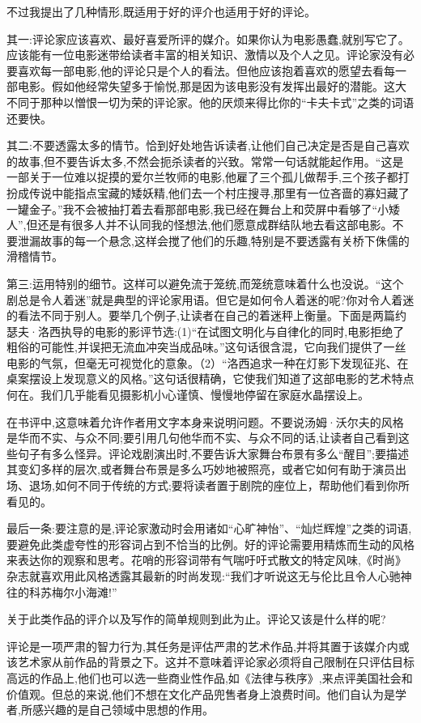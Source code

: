不过我提出了几种情形,既适用于好的评介也适用于好的评论。

其一:评论家应该喜欢、最好喜爱所评的媒介。如果你认为电影愚蠢,就别写它了。应该能有一位电影迷带给读者丰富的相关知识、激情以及个人之见。评论家没有必要喜欢每一部电影,他的评论只是个人的看法。但他应该抱着喜欢的愿望去看每一部电影。假如他经常失望多于愉悦,那是因为该电影没有发挥出最好的潜能。这大不同于那种以憎恨一切为荣的评论家。他的厌烦来得比你的“卡夫卡式”之类的词语还要快。

其二:不要透露太多的情节。恰到好处地告诉读者,让他们自己决定是否是自己喜欢的故事,但不要告诉太多,不然会扼杀读者的兴致。常常一句话就能起作用。“这是一部关于一位难以捉摸的爱尔兰牧师的电影,他雇了三个孤儿做帮手,三个孩子都打扮成传说中能指点宝藏的矮妖精,他们去一个村庄搜寻,那里有一位吝啬的寡妇藏了一罐金子。”我不会被抽打着去看那部电影,我已经在舞台上和荧屏中看够了“小矮人”,但还是有很多人并不认同我的怪想法,他们愿意成群结队地去看这部电影。不要泄漏故事的每一个悬念,这样会搅了他们的乐趣,特别是不要透露有关桥下侏儒的滑稽情节。

第三:运用特别的细节。这样可以避免流于笼统,而笼统意味着什么也没说。“这个剧总是令人着迷”就是典型的评论家用语。但它是如何令人着迷的呢?你对令人着迷的看法不同于别人。要举几个例子,让读者在自己的着迷秤上衡量。下面是两篇约瑟夫·洛西执导的电影的影评节选:(1)“在试图文明化与自律化的同时,电影拒绝了粗俗的可能性,并误把无流血冲突当成品味。”这句话很含混，它向我们提供了一丝电影的气氛，但毫无可视觉化的意象。（2）“洛西追求一种在灯影下发现征兆、在桌案摆设上发现意义的风格。”这句话很精确，它使我们知道了这部电影的艺术特点何在。我们几乎能看见摄影机小心谨慎、慢慢地停留在家庭水晶摆设上。

在书评中,这意味着允许作者用文字本身来说明问题。不要说汤姆·沃尔夫的风格是华而不实、与众不同;要引用几句他华而不实、与众不同的话,让读者自己看到这些句子有多么怪异。评论戏剧演出时,不要告诉大家舞台布景有多么“醒目”;要描述其变幻多样的层次,或者舞台布景是多么巧妙地被照亮，或者它如何有助于演员出场、退场,如何不同于传统的方式;要将读者置于剧院的座位上，帮助他们看到你所看见的。

最后一条:要注意的是,评论家激动时会用诸如“心旷神怡”、“灿烂辉煌”之类的词语,要避免此类虚夸性的形容词占到不恰当的比例。好的评论需要用精炼而生动的风格来表达你的观察和思考。花哨的形容词带有气喘吁吁式散文的特定风味,《时尚》杂志就喜欢用此风格透露其最新的时尚发现:“我们才听说这无与伦比且令人心驰神往的科苏梅尔小海滩!”

关于此类作品的评介以及写作的简单规则到此为止。评论又该是什么样的呢?

评论是一项严肃的智力行为,其任务是评估严肃的艺术作品,并将其置于该媒介内或该艺术家从前作品的背景之下。这并不意味着评论家必须将自己限制在只评估目标高远的作品上,他们也可以选一些商业性作品,如《法律与秩序》,来点评美国社会和价值观。但总的来说,他们不想在文化产品兜售者身上浪费时间。他们自认为是学者,所感兴趣的是自己领域中思想的作用。

